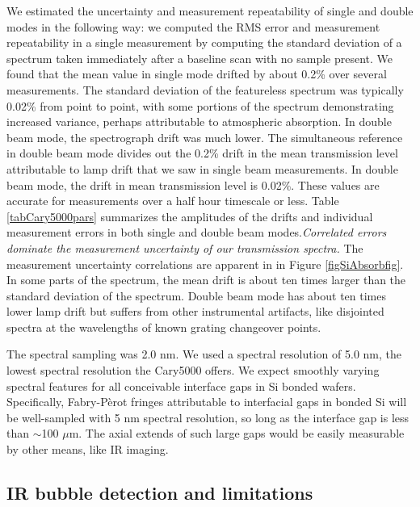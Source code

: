 \documentclass[osajnl,preprint,showpacs,superscriptaddress,12pt]{revtex4-1} %
\begin{document}
We estimated the uncertainty and measurement repeatability of single and double modes in the following way: we computed the RMS error and measurement repeatability in a single measurement by computing the standard deviation of a spectrum taken immediately after a baseline scan with no sample present.  We found that the mean value in single mode drifted by about 0.2\% over several measurements.  The standard deviation of the featureless spectrum was typically 0.02\% from point to point, with some portions of the spectrum demonstrating increased variance, perhaps attributable to atmospheric absorption.  In double beam mode, the spectrograph drift was much lower.  The simultaneous reference in double beam mode divides out the 0.2\% drift in the mean transmission level attributable to lamp drift that we saw in single beam measurements.  In double beam mode, the drift in mean transmission level is 0.02\%.  These values are accurate for measurements over a half hour timescale or less.  Table \ref{tabCary5000pars} summarizes the amplitudes of the drifts and individual measurement errors in both single and double beam modes.\emph{Correlated errors dominate the measurement uncertainty of our transmission spectra.}  The measurement uncertainty correlations are apparent in in Figure \ref{figSiAbsorbfig}.  In some parts of the spectrum, the mean drift is about ten times larger than the standard deviation of the spectrum.  Double beam mode has about ten times lower lamp drift but suffers from other instrumental artifacts, like disjointed spectra at the wavelengths of known grating changeover points.

The spectral sampling was 2.0 nm.  We used a spectral resolution of 5.0 nm, the lowest spectral resolution the Cary5000 offers.  We expect smoothly varying spectral features for all conceivable interface gaps in Si bonded wafers.  Specifically, Fabry-P\`erot fringes attributable to interfacial gaps in bonded Si will be well-sampled with 5 nm spectral resolution, so long as the interface gap is less than $\sim$100 $\mu$m.  The axial extends of such large gaps would be easily measurable by other means, like IR imaging.




\subsection{IR bubble detection and limitations}
\end{document}
